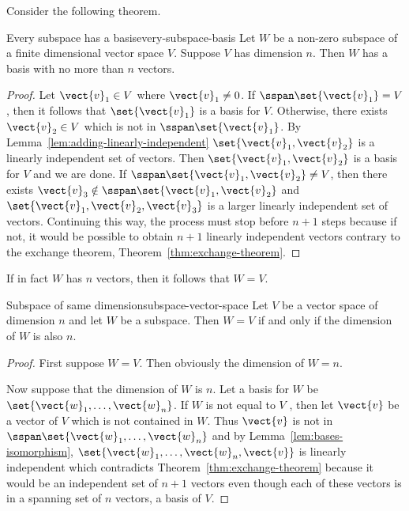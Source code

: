 Consider the following theorem. 

\begin{theorem}{Every subspace has a basis}{every-subspace-basis}
Let $W$ be a non-zero subspace of a finite dimensional vector
space $V$. Suppose $V$ has dimension $n$.
Then $W$ has a basis
with no more than $n$ vectors.
\end{theorem}

\begin{proof}
Let $\vect{v}_{1}\in V$ where $\vect{v}_{1}\neq 0$. If $
\sspan\set{\vect{v}_{1}} =V$, then it follows that $\set{\vect{v}
_{1}} $ is a basis for $V$. Otherwise, there exists $\vect{v}
_{2}\in V$ which is not in $\sspan\set{\vect{v}_{1}}$. By
Lemma~\ref{lem:adding-linearly-independent} $\set{\vect{v}_{1},\vect{v}_{2}} $ is a
linearly independent set of vectors. Then $\set{\vect{v}_{1},\vect{v}
_{2}} $ is a basis for $V$ and we are done. If $\sspan\set{\vect{v}_{1},
\vect{v}_{2}} \neq V$, then there exists $\vect{v}_{3}\notin \sspan\set{\vect{v}_{1},\vect{v}_{2}} $ and $\set{\vect{v}
_{1},\vect{v}_{2},\vect{v}_{3}} $ is a larger linearly
independent set of vectors. Continuing this way, the process must stop
before $n+1$ steps because if not, it would be possible to obtain $n+1$
linearly independent vectors contrary to the exchange theorem, Theorem~\ref{thm:exchange-theorem}. 
\end{proof}

If in fact $W$ has $n$ vectors, then it follows that $W=V$. 

\begin{theorem}{Subspace of same dimension}{subspace-vector-space}
Let $V$ be a vector space of dimension $n$ and let $W$ be a
subspace. Then $W=V$ if and only if the dimension of $W$ is also $n$.
\end{theorem}

\begin{proof}First suppose $W=V$. Then obviously the dimension of $W=n$.

Now suppose that the dimension of $W$ is $n$. Let a basis for $W$ be $
\set{\vect{w}_{1},\ldots,\vect{w}_{n}}$. If $W$ is not equal to $V$
, then let $\vect{v}$ be a vector of $V$ which is not contained in $W$. Thus $
\vect{v}$ is not in $\sspan\set{\vect{w}_{1},\ldots,\vect{w}
_{n}} $ and by Lemma~\ref{lem:bases-isomorphism}, $\set{\vect{w}_{1},\ldots,\vect{w}_{n},\vect{v}} $ is linearly independent which contradicts
Theorem~\ref{thm:exchange-theorem} because it would be an independent set of $n+1$
vectors even though each of these vectors is in a spanning set of $n$
vectors, a basis of $V$. 
\end{proof}

